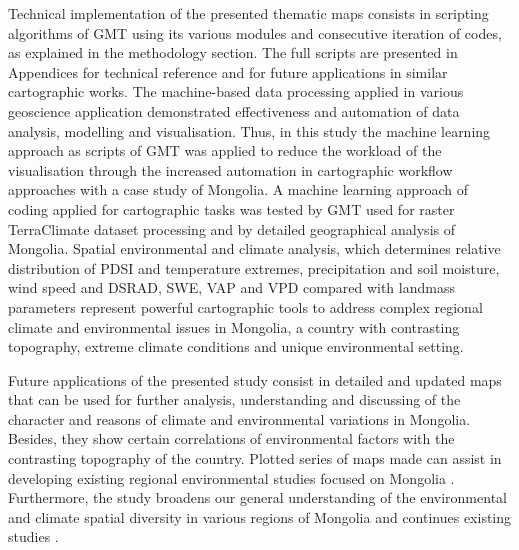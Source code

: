 \documentclass[geosciences,article,submit,pdftex,moreauthors]{Definitions/mdpi}
\begin{document}
Technical implementation of the presented thematic maps consists in scripting algorithms of GMT using its various modules and consecutive iteration of codes, as explained in the methodology section. The full scripts are presented in Appendices for technical reference and for future applications in similar cartographic works. The machine-based data processing applied in various geoscience application \cite{Lemenkova2019c,Lemenkov2021} demonstrated effectiveness and automation of data analysis, modelling and visualisation. Thus, in this study the machine learning approach as scripts of GMT was applied to reduce the workload of the visualisation through the increased automation in cartographic workflow approaches with a case study of Mongolia.  A machine learning approach of coding applied for cartographic tasks was tested by GMT used for raster TerraClimate dataset processing and by detailed geographical analysis of Mongolia. Spatial environmental and climate analysis, which determines relative distribution of PDSI and temperature extremes, precipitation and soil moisture, wind speed and DSRAD, SWE, VAP and VPD compared with landmass parameters represent powerful cartographic tools to address complex regional climate and environmental issues in Mongolia, a country with contrasting topography, extreme climate conditions and unique environmental setting. 

Future applications of the presented study consist in detailed and updated maps that can be used for further analysis, understanding and discussing of the character and reasons of climate and environmental variations in Mongolia. Besides, they show certain correlations of environmental factors with the contrasting topography of the country. Plotted series of maps made can assist in developing existing regional environmental studies focused on Mongolia \cite{MAS,Pfeiffer}. Furthermore, the study broadens our general understanding of the environmental and climate spatial diversity in various regions of Mongolia and continues existing studies \cite{Altanbold,Jamyansuren,Jugder}. 

\end{document}

